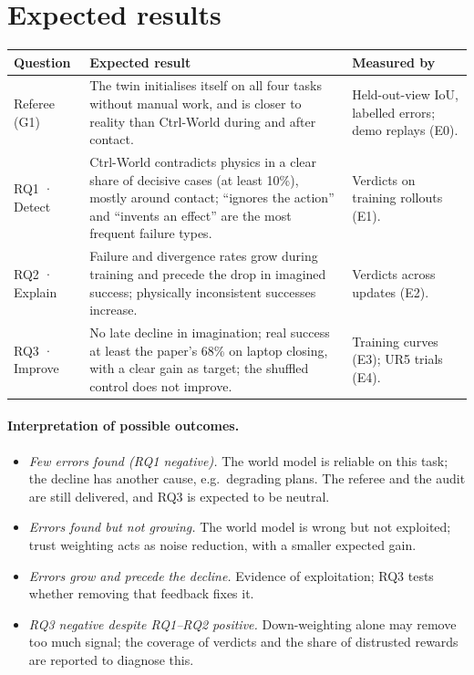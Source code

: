 \documentclass[11pt,a4paper]{article}
\theoremstyle{plain}
\theoremstyle{definition}
\theoremstyle{remark}
\begin{document}
\section{Expected results}\label{sec:expected}
\begin{center}\small
\begin{tabularx}{\linewidth}{@{}>{\raggedright\arraybackslash}p{2.6cm}>{\raggedright\arraybackslash}X>{\raggedright\arraybackslash}p{4.4cm}@{}}
\toprule
\textbf{Question} & \textbf{Expected result} & \textbf{Measured by}\\
\midrule
Referee (G1) & The twin initialises itself on all four tasks without manual work, and is closer to reality than Ctrl-World during and after contact. & Held-out-view IoU, labelled errors; demo replays (E0).\\
RQ1 · Detect & Ctrl-World contradicts physics in a clear share of decisive cases (at least 10\%), mostly around contact; ``ignores the action'' and ``invents an effect'' are the most frequent failure types. & Verdicts on training rollouts (E1).\\
RQ2 · Explain & Failure and divergence rates grow during training and precede the drop in imagined success; physically inconsistent successes increase. & Verdicts across updates (E2).\\
RQ3 · Improve & No late decline in imagination; real success at least the paper's 68\% on laptop closing, with a clear gain as target; the shuffled control does not improve. & Training curves (E3); UR5 trials (E4).\\
\bottomrule
\end{tabularx}
\end{center}

\paragraph{Interpretation of possible outcomes.}
\begin{itemize}
\item \emph{Few errors found (RQ1 negative).} The world model is reliable on this task; the decline has another cause, e.g.\ degrading plans. The referee and the audit are still delivered, and RQ3 is expected to be neutral.
\item \emph{Errors found but not growing.} The world model is wrong but not exploited; trust weighting acts as noise reduction, with a smaller expected gain.
\item \emph{Errors grow and precede the decline.} Evidence of exploitation; RQ3 tests whether removing that feedback fixes it.
\item \emph{RQ3 negative despite RQ1--RQ2 positive.} Down-weighting alone may remove too much signal; the coverage of verdicts and the share of distrusted rewards are reported to diagnose this.
\end{itemize}
\end{document}
